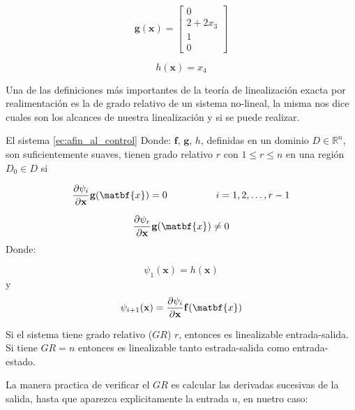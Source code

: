 \documentclass[10pt]{article}
\begin{document}
\begin{equation}
    \mathbf{g(\mathbf{x})}=
\begin{bmatrix}
 0\\
 2+ 2x_{3} \\
 1\\
 0
\end{bmatrix}
\label{ec:g}
\end{equation}

\begin{equation}
    h(\mathbf{x}) = x_{4}
\end{equation}

Una de las definiciones más importantes de la teoría de linealización exacta por
realimentación es la de grado relativo de un sistema no-lineal, la misma nos dice
cuales son los alcances de nuestra linealización y si se puede realizar.

\begin{defi}
    El sistema \eqref{ec:afin_al_control} Donde: $\mathbf{f}$, $\mathbf{g}$, $h$, definidas
    en un dominio $D\in \mathbb{R}^{n}$, son suficientemente suaves, tienen grado relativo $r$
    con $1\leq r \leq n$ en una región $D_{0}\in D$ si

\begin{equation}
    \frac{\partial \psi_{i}}{\partial \mathbf{x}}\mathbf{g}(\matbf{x}) = 0 \hspace{5em} i=1,2,\dots , r-1
\end{equation}

\begin{equation}
    \frac{\partial \psi_{r}}{\partial \mathbf{x}} \mathbf{g}(\matbf{x}) \neq 0  
\end{equation}
       Donde:

\begin{equation}
    \psi_{1}(\mathbf{x}) = h(\mathbf{x}) 
     \label{ec:restriccion_phi_1}
\end{equation}
y
\begin{equation}
     \psi_{i+1}(\mathbf{x}) = \frac{\partial \psi_{i}}{\partial \mathbf{x}}\mathbf{f}(\matbf{x}) 
     \label{ec:restriccion_phi_2}
\end{equation}

\end{defi}   


Si el sistema tiene grado relativo ($GR$) $r$, entonces es linealizable entrada-salida. Si
tiene $GR=n$ entonces es linealizable tanto estrada-salida como entrada-estado.

La manera practica de verificar el $GR$ es calcular las derivadas sucesivas de la salida, hasta
que aparezca explicitamente la entrada $u$, en nuetro caso:
\end{document}
